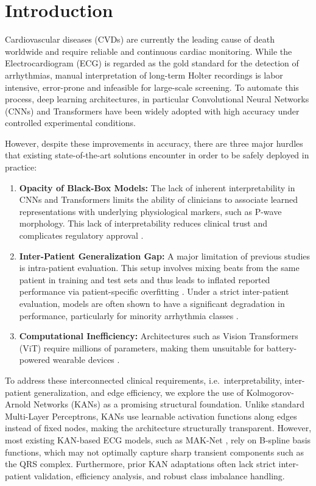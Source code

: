 \documentclass[final,5p,times,twocolumn,number]{elsarticle}
\begin{document}
\section{Introduction}

Cardiovascular diseases (CVDs) are currently the leading cause of death worldwide and require reliable and continuous cardiac monitoring. While the Electrocardiogram (ECG) is regarded as the gold standard for the detection of arrhythmias, manual interpretation of long-term Holter recordings is labor intensive, error-prone and infeasible for large-scale screening. To automate this process, deep learning architectures, in particular Convolutional Neural Networks (CNNs) \cite{takalo-mattila_inter-patient_2018, guo_inter-patient_2019} and Transformers \cite{akan_ecgformer_2024} have been widely adopted with high accuracy under controlled experimental conditions.

However, despite these improvements in accuracy, there are three major hurdles that existing state-of-the-art solutions encounter in order to be safely deployed in practice: 

\begin{enumerate}
    \item \textbf{Opacity of Black-Box Models:} The lack of inherent interpretability in CNNs and Transformers limits the ability of clinicians to associate learned representations with underlying physiological markers, such as P-wave morphology. This lack of interpretability reduces clinical trust and complicates regulatory approval \cite{taleban_explainable_2026}. 
    \item \textbf{Inter-Patient Generalization Gap:} A major limitation of previous studies is intra-patient evaluation. This setup involves mixing beats from the same patient in training and test sets and thus leads to inflated reported performance via patient-specific overfitting \cite{bahrami_investigation_2025}. Under a strict inter-patient evaluation, models are often shown to have a significant degradation in performance, particularly for minority arrhythmia classes \cite{xiao_deep_2023, silva_systematic_2025}.
    \item \textbf{Computational Inefficiency:} Architectures such as Vision Transformers (ViT) require millions of parameters, making them unsuitable for battery-powered wearable devices \cite{elsheikhy_lightweight_2025}.
\end{enumerate}

To address these interconnected clinical requirements, i.e.\ interpretability, inter-patient generalization, and edge efficiency, we explore the use of Kolmogorov-Arnold Networks (KANs) \cite{liu_kan_2024} as a promising structural foundation. Unlike standard Multi-Layer Perceptrons, KANs use learnable activation functions along edges instead of fixed nodes, making the architecture structurally transparent. However, most existing KAN-based ECG models, such as MAK-Net \cite{zhao_mak-net_2025}, rely on B-spline basis functions, which may not optimally capture sharp transient components such as the QRS complex. Furthermore, prior KAN adaptations often lack strict inter-patient validation, efficiency analysis, and robust class imbalance handling.
\end{document}
